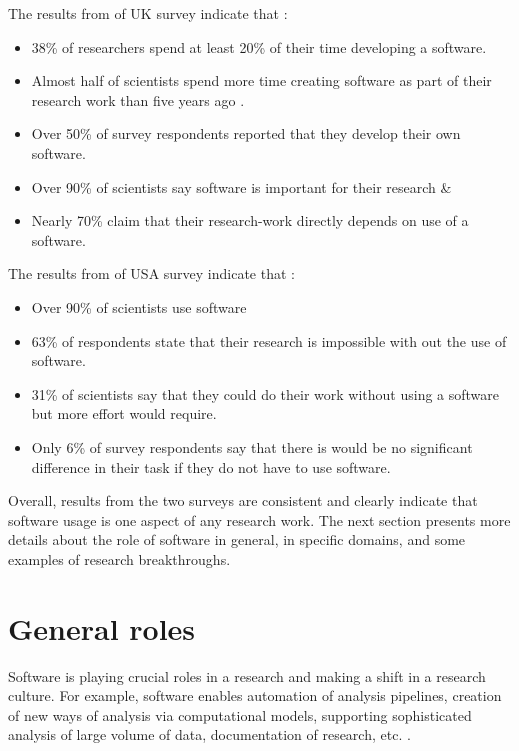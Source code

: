 The results from of \ac{UK} survey indicate that \citep{merali2010computational, nangia2017track}:
\begin{itemize}%
	\item 38\% of researchers spend at least 20\% of their time developing a software.
	\item Almost half of scientists spend more time creating software as part of their research work than five years ago .
	\item Over 50\% of survey respondents reported that they develop their own software. 
	\item Over 90\% of scientists say software is important for their research \&
	\item Nearly 70\% claim that their research-work directly depends on use of a software.  
	

\end{itemize}

The results from of \ac{USA} survey indicate that \citep{nangia2017track}:
\begin{itemize}%
	\item Over 90\% of scientists use software 
	\item 63\% of respondents state that their research is impossible with out the use of software.
	\item 31\% of scientists say that they could do their work without using a software but more effort would require.
	\item Only 6\% of survey respondents say that there is would be no significant difference in their task if they do not have to use software. 
	
\end{itemize}

Overall, results from the two surveys are consistent and clearly indicate that software usage is one aspect of any research work. The next section presents more details about the role of software in general, in specific domains, and some examples of research breakthroughs.

\section{General roles}
\label{subsec:background:first_section:first_subsection}

Software is playing crucial roles in a research and making a shift in a research culture. For example, software enables automation of analysis pipelines, creation of new ways of analysis via computational models, supporting sophisticated analysis of large volume of data, documentation of research, etc.  \citep{ jay2020software}. 

